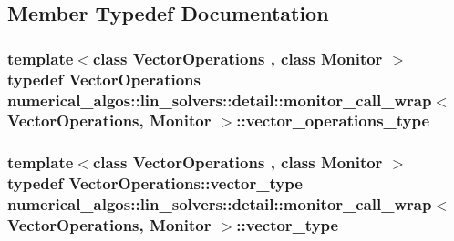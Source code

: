 \subsection{Member Typedef Documentation}
\hypertarget{structnumerical__algos_1_1lin__solvers_1_1detail_1_1monitor__call__wrap_aa04de6689ce29ef879768e365695a054}{
\subsubsection[{vector\-\_\-operations\-\_\-type}]{\setlength{\rightskip}{0pt plus 5cm}template$<$class Vector\-Operations , class Monitor $>$ typedef Vector\-Operations {\bf numerical\-\_\-algos\-::lin\-\_\-solvers\-::detail\-::monitor\-\_\-call\-\_\-wrap}$<$ Vector\-Operations, Monitor $>$\-::{\bf vector\-\_\-operations\-\_\-type}}}\label{structnumerical__algos_1_1lin__solvers_1_1detail_1_1monitor__call__wrap_aa04de6689ce29ef879768e365695a054}
\hypertarget{structnumerical__algos_1_1lin__solvers_1_1detail_1_1monitor__call__wrap_a7fc0dd90e41eee6b70e65ac9b4fb5131}{
\subsubsection[{vector\-\_\-type}]{\setlength{\rightskip}{0pt plus 5cm}template$<$class Vector\-Operations , class Monitor $>$ typedef Vector\-Operations\-::vector\-\_\-type {\bf numerical\-\_\-algos\-::lin\-\_\-solvers\-::detail\-::monitor\-\_\-call\-\_\-wrap}$<$ Vector\-Operations, Monitor $>$\-::{\bf vector\-\_\-type}}}\label{structnumerical__algos_1_1lin__solvers_1_1detail_1_1monitor__call__wrap_a7fc0dd90e41eee6b70e65ac9b4fb5131}


